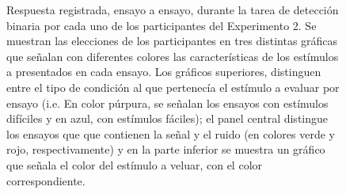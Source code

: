 \begin{figure}[th]
\caption[Respuesta binaria registrada ensayo a ensayo en relación con el tipo de estímulo a evaluar; Experimento 2]{Respuesta registrada, ensayo a ensayo, durante la tarea de detección binaria por cada uno de los participantes del Experimento 2. Se muestran las elecciones de los participantes en tres distintas gráficas que señalan con diferentes colores las características de los estímulos a presentados en cada ensayo. Los gráficos superiores, distinguen entre el tipo de condición al que pertenecía el estímulo a evaluar por ensayo (i.e. En color púrpura, se señalan los ensayos con estímulos difíciles y en azul, con estímulos fáciles); el panel central distingue los ensayos que que contienen la señal y el ruido (en colores verde y rojo, respectivamente) y en la parte inferior se muestra un gráfico que señala el color del estímulo a veluar, con el color correspondiente.}
\label{fig:BiasResp_E1}
\end{figure}



